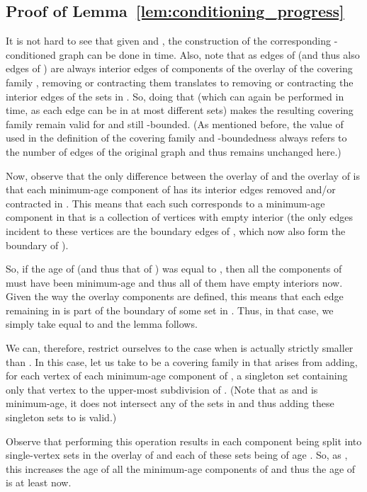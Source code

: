 \documentclass[11pt, letterpaper]{article}
\begin{document}
\subsection{Proof of Lemma~\ref{lem:conditioning_progress}} \label{app:conditioning_progress}

It is not hard to see that given  and , the construction of the corresponding -conditioned graph  can be done in  time. Also, note that as edges of  (and thus also edges of ) are always interior edges of components of the overlay  of the covering family , removing or contracting them translates to removing or contracting the interior edges of the sets in . So, doing that (which can again be performed in  time, as each edge can be in at most  different sets) makes the resulting covering family  remain valid for  and still -bounded. (As mentioned before, the value of  used in the definition of the covering family and -boundedness always refers to the number of edges of the original graph and thus remains unchanged here.)

Now, observe that the only difference between the overlay  of  and the overlay  of  is that each minimum-age component  of  has its interior edges removed and/or contracted in . This means that each such  corresponds to a minimum-age component  in  that is a collection of vertices with empty interior (the only edges incident to these vertices are the boundary edges of , which now also form the boundary of ). 

So, if the age  of  (and thus that of ) was equal to , then all the components of  must have been minimum-age and thus all of them have empty interiors now. Given the way the overlay components are defined, this means that each edge remaining in  is part of the boundary of some set in . Thus, in that case, we simply take  equal to  and the lemma follows. 

We can, therefore, restrict ourselves to the case when  is actually strictly smaller than . In this case, let us take  to be a covering family in  that arises from adding, for each vertex of each minimum-age component  of , a singleton set containing only that vertex to the upper-most subdivision  of . (Note that as  and  is minimum-age, it does not intersect any of the sets in  and thus adding these singleton sets to  is valid.)

Observe that performing this operation results in each component  being split into single-vertex sets in the overlay  of  and each of these sets being of age . So, as , this increases the age of all the minimum-age components of  and thus the age of  is at least  now.
\end{document}
